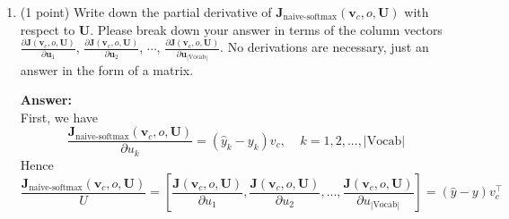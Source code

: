 \documentclass{article}
\newenvironment{answer}{
    {\bf Answer:} \sf \begingroup\color{red}
}{\endgroup}%
\begin{document}
\begin{enumerate}[label=(\alph*)]
\begin{shaded}
\begin{answer}
$$\bm J_{\text{naive-softmax}}(\bm v_c, o, \bm U)
= -\log P(O=o| C=c) 
= - \frac{\exp(\bm u_{o}^\top \bm v_c)}{\sum_{w} \exp(\bm u_{w}^\top \bm v_c)}
= - \bm u_{o}^\top \bm v_c + \log  \sum_{w \in \text{Vocab}} \exp(\bm u_{w}^\top \bm v_c) $$

\begin{align}
\frac{\partial J(\bm v_c, o, \bm U)}{\partial u_w}
&= - \frac{\partial}{\partial u_w} u_o^\top v_c + \frac{1}{\sum_w \exp(\bm u_{w}^\top \bm v_c)} * \frac{\partial}{\partial u_w} \sum_{w} \exp(\bm u_{w}^\top \bm v_c) \\
&= - \frac{\partial}{\partial u_w} u_o^\top v_c + \frac{\exp(\bm u_{w}^\top \bm v_c)}{\sum_w \exp(\bm u_{w}^\top \bm v_c)} v_c \\
&= - \frac{\partial}{\partial u_w} u_o^\top v_c + \hat{y}_w v_c \\
&= -y_wv _c + \hat{y}_w v_c \\
&= (\hat{y}_w - y_w) v_c \\
\end{align}
\end{answer}
\end{shaded}
\begin{shaded}
\begin{answer} \\
where 
\[
   y_w =
\begin{cases}
    1     & \text{if } w = o \\
    0     & \text{if } w \neq o
\end{cases}
\]
\end{answer}
\end{shaded}

\item (1 point) Write down the partial derivative of $\bm J_{\text{naive-softmax}}(\bm v_c, o, \bm U)$ with respect to $\bm U$. Please break down your answer in terms of the column vectors $\frac{\partial \bm J(\bm v_c, o, \bm U)}{\partial \bm u_1}$, $\frac{\partial \bm J(\bm v_c, o, \bm U)}{\partial \bm u_2}$, $\cdots$, $\frac{\partial \bm J(\bm v_c, o, \bm U)}{\partial \bm u_{|\text{Vocab}|}}$. No derivations are necessary, just an answer in the form of a matrix.

\begin{shaded}
\begin{answer} \\
First, we have
$$ \frac{\bm J_{\text{naive-softmax}}(\bm v_c, o, \bm U)}{\partial u_k} = (\hat{y}_k - y_k) v_c, \; \; \; \; k = 1, 2, ..., | \text{Vocab}|$$
Hence
$$ \frac{\bm J_{\text{naive-softmax}}(\bm v_c, o, \bm U)}{U} = \left[\frac{\bm J(\bm v_c, o, \bm U)}{\partial u_1},  \frac{\bm J(\bm v_c, o, \bm U)}{\partial u_2}, ..., \frac{\bm J(\bm v_c, o, \bm U)}{\partial u_{| \text{Vocab} |}} \right] = (\hat{y} - y) v^\top_c $$
\end{answer}
\end{shaded}


\end{enumerate}
\end{document}
